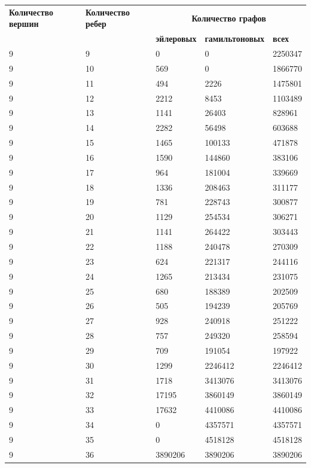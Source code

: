 \documentclass[12pt]{article}
\begin{document}
	\begin{tabular}{|m{3cm}|m{3cm}|m{2.5cm}|m{3.5cm}|m{2cm}|}
		\hline
		{\bf Количество вершин} & {\bf Количество ребер} & \multicolumn{3}{|c|}{\bf Количество графов}\\
		\cline{3-5}
		& & {\bf эйлеровых} &{\bf гамильтоновых} & {\bf всех} \\
		\hline
		9 & 9 & 0 & 0 & 2250347 \\
		\hline
		9 & 10 & 569 & 0 & 1866770 \\
		\hline
		9 & 11 & 494 & 2226 & 1475801 \\
		\hline
		9 & 12 & 2212 & 8453 & 1103489 \\
		\hline
		9 & 13 & 1141 & 26403 & 828961 \\
		\hline
		9 & 14 & 2282 & 56498 & 603688 \\
		\hline
		9 & 15 & 1465 & 100133 & 471878 \\
		\hline
		9 & 16 & 1590 & 144860 & 383106 \\
		\hline
		9 & 17 & 964 & 181004 & 339669 \\
		\hline
		9 & 18 & 1336 & 208463 & 311177 \\
		\hline
		9 & 19 & 781 & 228743 & 300877 \\
		\hline
		9 & 20 & 1129 & 254534 & 306271 \\
		\hline
		9 & 21 & 1141 & 264422 & 303443 \\
		\hline
		9 & 22 & 1188 & 240478 & 270309 \\
		\hline
		9 & 23 & 624 & 221317 & 244116 \\
		\hline
		9 & 24 & 1265 & 213434 & 231075 \\
		\hline
		9 & 25 & 680 & 188389 & 202509 \\
		\hline
		9 & 26 & 505 & 194239 & 205769 \\
		\hline
		9 & 27 & 928 & 240918 & 251222 \\
		\hline
		9 & 28 & 757 & 249320 & 258594 \\
		\hline
		9 & 29 & 709 & 191054 & 197922 \\
		\hline
		9 & 30 & 1299 & 2246412 & 2246412 \\
		\hline
		9 & 31 & 1718 & 3413076 & 3413076 \\
		\hline
		9 & 32 & 17195 & 3860149 & 3860149 \\
		\hline
		9 & 33 & 17632 & 4410086 & 4410086 \\
		\hline
		9 & 34 & 0 & 4357571 & 4357571 \\
		\hline
		9 & 35 & 0 & 4518128 & 4518128 \\
		\hline
		9 & 36 & 3890206 & 3890206 & 3890206 \\
		\hline
	\end{tabular}
	
\end{document}
